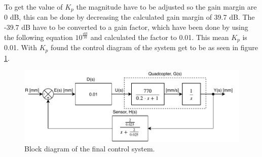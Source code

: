 \newline
To get the value of $K_p$ the magnitude have to be adjusted so the gain margin are 0 dB, this can be done by decreasing the calculated gain margin of 39.7 dB.
The -39.7 dB have to be converted to a gain factor, which have been done by using the following equation \(10^\frac{dB}{10}\) and calculated the factor to 0.01. This mean $K_p$ is 0.01.
With $K_p$ found the control diagram of the system get to be as seen in figure \ref{fig:dec_Final_block_diagram}.

\begin{figure}[H]
    \centering
    \includegraphics[width=\textwidth]{figures/ch_design/controller/FinalControlDiagram.pdf}
    \caption{Block diagram of the final control system.}
    \label{fig:dec_Final_block_diagram}
\end{figure}







